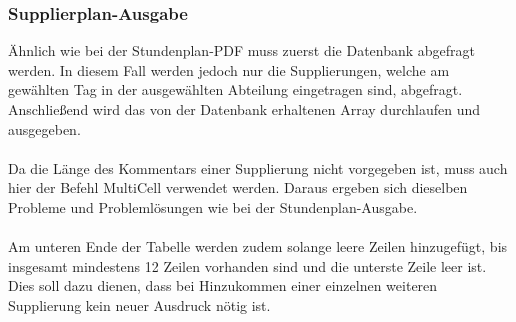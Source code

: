 


\subsubsection{Supplierplan-Ausgabe}

Ähnlich wie bei der Stundenplan-PDF muss zuerst die Datenbank abgefragt werden. In diesem Fall werden jedoch nur die Supplierungen, welche am gewählten Tag in der ausgewählten Abteilung eingetragen sind, abgefragt.\\
Anschließend wird das von der Datenbank erhaltenen Array durchlaufen und ausgegeben.\\\\
Da die Länge des Kommentars einer Supplierung nicht vorgegeben ist, muss auch hier der Befehl MultiCell verwendet werden. Daraus ergeben sich dieselben Probleme und Problemlösungen wie bei der Stundenplan-Ausgabe.\\\\
Am unteren Ende der Tabelle werden zudem solange leere Zeilen hinzugefügt, bis insgesamt mindestens 12 Zeilen vorhanden sind und die unterste Zeile leer ist. Dies soll dazu dienen, dass bei Hinzukommen einer einzelnen weiteren Supplierung kein neuer Ausdruck nötig ist.
